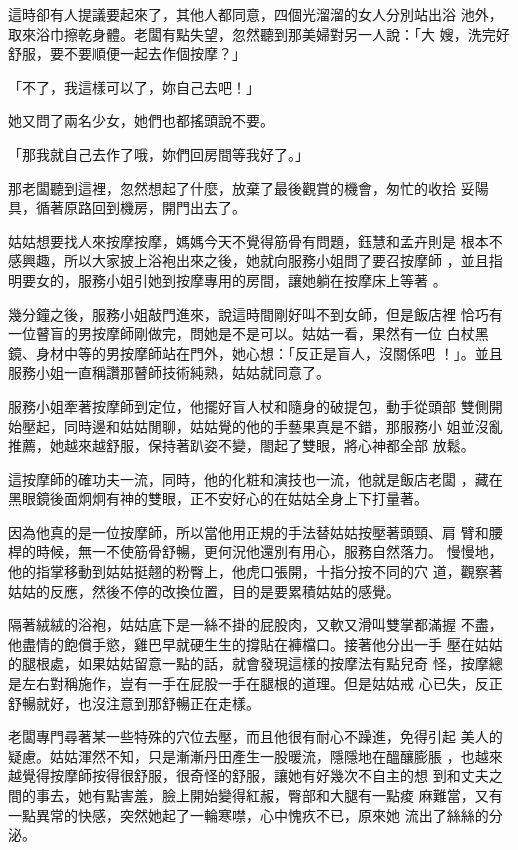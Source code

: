 這時卻有人提議要起來了，其他人都同意，四個光溜溜的女人分別站出浴
池外，取來浴巾擦乾身體。老闆有點失望，忽然聽到那美婦對另一人說：「大
嫂，洗完好舒服，要不要順便一起去作個按摩？」

「不了，我這樣可以了，妳自己去吧！」

她又問了兩名少女，她們也都搖頭說不要。

「那我就自己去作了哦，妳們回房間等我好了。」

那老闆聽到這裡，忽然想起了什麼，放棄了最後觀賞的機會，匆忙的收拾
妥陽具，循著原路回到機房，開門出去了。

姑姑想要找人來按摩按摩，媽媽今天不覺得筋骨有問題，鈺慧和孟卉則是
根本不感興趣，所以大家披上浴袍出來之後，她就向服務小姐問了要召按摩師
，並且指明要女的，服務小姐引她到按摩專用的房間，讓她躺在按摩床上等著
。

幾分鐘之後，服務小姐敲門進來，說這時間剛好叫不到女師，但是飯店裡
恰巧有一位瞽盲的男按摩師剛做完，問她是不是可以。姑姑一看，果然有一位
白杖黑鏡、身材中等的男按摩師站在門外，她心想：「反正是盲人，沒關係吧
！」。並且服務小姐一直稱讚那瞽師技術純熟，姑姑就同意了。

服務小姐牽著按摩師到定位，他擺好盲人杖和隨身的破提包，動手從頭部
雙側開始壓起，同時邊和姑姑閒聊，姑姑覺的他的手藝果真是不錯，那服務小
姐並沒亂推薦，她越來越舒服，保持著趴姿不變，閤起了雙眼，將心神都全部
放鬆。

這按摩師的確功夫一流，同時，他的化粧和演技也一流，他就是飯店老闆
，藏在黑眼鏡後面炯炯有神的雙眼，正不安好心的在姑姑全身上下打量著。

因為他真的是一位按摩師，所以當他用正規的手法替姑姑按壓著頭頸、肩
臂和腰桿的時候，無一不使筋骨舒暢，更何況他還別有用心，服務自然落力。
慢慢地，他的指掌移動到姑姑挺翹的粉臀上，他虎口張開，十指分按不同的穴
道，觀察著姑姑的反應，然後不停的改換位置，目的是要累積姑姑的感覺。

隔著絨絨的浴袍，姑姑底下是一絲不掛的屁股肉，又軟又滑叫雙掌都滿握
不盡，他盡情的飽償手慾，雞巴早就硬生生的撐貼在褲檔口。接著他分出一手
壓在姑姑的腿根處，如果姑姑留意一點的話，就會發現這樣的按摩法有點兒奇
怪，按摩總是左右對稱施作，豈有一手在屁股一手在腿根的道理。但是姑姑戒
心已失，反正舒暢就好，也沒注意到那舒暢正在走樣。

老闆專門尋著某一些特殊的穴位去壓，而且他很有耐心不躁進，免得引起
美人的疑慮。姑姑渾然不知，只是漸漸丹田產生一股暖流，隱隱地在醞釀膨脹
，也越來越覺得按摩師按得很舒服，很奇怪的舒服，讓她有好幾次不自主的想
到和丈夫之間的事去，她有點害羞，臉上開始變得紅赧，臀部和大腿有一點痠
麻難當，又有一點異常的快感，突然她起了一輪寒噤，心中愧疚不已，原來她
流出了絲絲的分泌。

